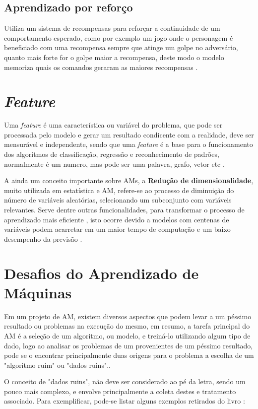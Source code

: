 \subsection{Aprendizado por reforço} 
Utiliza um sistema de recompensas para reforçar a continuidade de um comportamento esperado, como por exemplo um jogo onde o personagem é beneficiado com uma recompensa sempre que atinge um golpe no adversário, quanto mais forte for o golpe maior a recompensa, deste modo o modelo memoriza quais os comandos geraram as maiores recompensas \cite{kirk2014thoughtful}.

\section{\textit{Feature}}
Uma \textit{feature} é uma característica ou variável do problema, que pode ser processada pelo modelo e gerar um resultado condicente com a realidade, deve ser mensurável e independente, sendo que uma \textit{feature} é a base para o funcionamento dos algoritmos de classificação, regressão e reconhecimento de padrões, normalmente é um numero, mas pode ser uma palavra, grafo, vetor etc \cite{chandrashekar2014survey}.

A ainda um conceito importante sobre AMs, a \textbf{Redução de dimensionalidade}, muito utilizada em estatística e AM, refere-se ao processo de diminuição do número de variáveis aleatórias, selecionando um subconjunto com variáveis relevantes. Serve dentre outras funcionalidades, para transformar o processo de aprendizado mais eficiente \cite{borges2006reduccao}, isto ocorre devido a modelos com centenas de variáveis podem acarretar em um maior tempo de computação e um baixo desempenho da previsão \cite{chandrashekar2014survey}.

\section{Desafios do Aprendizado de Máquinas}
Em um projeto de AM, existem diversos aspectos que podem levar a um péssimo resultado ou problemas na execução do mesmo, em resumo, a tarefa principal do AM é a seleção de um algoritmo, ou modelo, e treiná-lo utilizando algum tipo de dado, logo ao analisar os problemas de um provenientes de um péssimo resultado, pode se o encontrar principalmente duas origens para o problema a escolha de um "algoritmo ruim" ou  "dados ruins".\cite{geron2017hands}.

O conceito de "dados ruins", não deve ser considerado ao pé da letra, sendo um pouco mais complexo, e envolve principalmente a coleta destes e tratamento associado. Para exemplificar,  pode-se listar alguns exemplos retirados do livro \cite{geron2017hands}:

